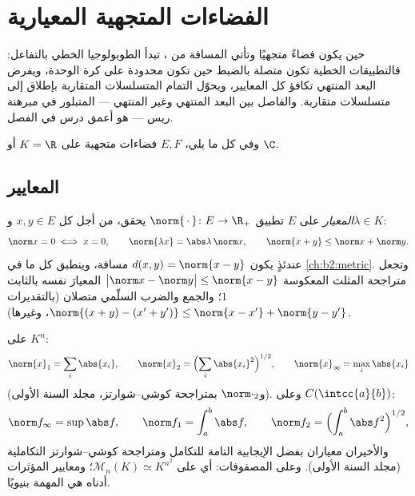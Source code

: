 \chapter{الفضاءات المتجهية المعيارية}\label{ch:b2:nvs}

حين يكون  فضاءً متجهيًا وتأتي المسافة من
، تبدأ الطوبولوجيا  الخطي بالتفاعل: فالتطبيقات الخطية
تكون متصلة بالضبط حين تكون محدودة على كرة الوحدة،
ويفرض البعد المنتهي تكافؤ كل المعايير، ويحوّل التمام
المتسلسلات المتقاربة بإطلاق إلى متسلسلات متقاربة. والفاصل
بين البعد المنتهي وغير المنتهي --- المتبلور في مبرهنة ريس ---
هو أعمق درس في الفصل.

وفي كل ما يلي، $E, F$ فضاءات متجهية على $K = \R$ أو $\C$.

\section{المعايير}

\begin{definition}\label{def:b2:nvs:norm}
\emph{المعيار} على $E$ تطبيق $\norm{\,\cdot\,} \colon E
\to \R_+$ يحقق، من أجل كل $x, y \in E$ و$\lambda \in K$:
\[
\norm x = 0 \iff x = 0,
\qquad
\norm{\lambda x} = \abs\lambda\,\norm x,
\qquad
\norm{x + y} \leq \norm x + \norm y .
\]
عندئذٍ يكون $d(x, y) = \norm{x - y}$ مسافة، وينطبق كل ما في
\cref{ch:b2:metric}. وتجعل متراجحة المثلث المعكوسة
$\bigl|\norm x - \norm y\bigr| \leq \norm{x - y}$ المعيارَ نفسه
 بالثابت $1$؛ والجمع والضرب السلّمي
متصلان (بالتقديرات $\norm{(x + y) - (x' + y')} \leq \norm{x -
x'} + \norm{y - y'}$، وغيرها).
\end{definition}

\begin{example}\label{ex:b2:nvs:examples}
على $K^n$:
\[
\norm{x}_1 = \sum_i \abs{x_i},
\qquad
\norm{x}_2 = \Bigl(\sum_i \abs{x_i}^2\Bigr)^{1/2},
\qquad
\norm{x}_\infty = \max_i \abs{x_i}
\]
(و$\norm\cdot_2$  بمتراجحة كوشي--شوارتز، مجلد السنة الأولى). وعلى
$C(\intcc{a}{b})$:
\[
\norm f_\infty = \sup \abs f,
\qquad
\norm f_1 = \int_a^b \abs f,
\qquad
\norm f_2 = \Bigl(\int_a^b \abs f^2\Bigr)^{1/2},
\]
والأخيران معياران بفضل الإيجابية التامة
للتكامل ومتراجحة كوشي--شوارتز التكاملية (مجلد السنة الأولى). وعلى المصفوفات:
أي  على $\mathcal M_n(K) \simeq K^{n^2}$؛ ومعايير المؤثرات
أدناه هي المهمة بنيويًا.
\end{example}

